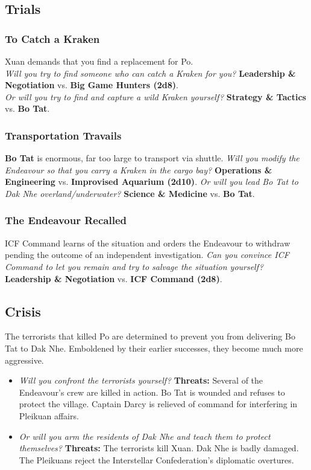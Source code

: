 \documentclass[11pt, a5paper, parskip=half-, DIV=12]{scrartcl}
\begin{document}
\newpage

\subsection*{Trials}
\subsubsection*{To Catch a Kraken}
Xuan demands that you find a replacement for Po. \\
\textit{Will you try to find someone who can catch a Kraken for you?} \textbf{Leadership \& Negotiation} vs. \textbf{Big Game Hunters (2d8)}. \\ \textit{Or will you try to find and capture a wild Kraken yourself?} \textbf{Strategy \& Tactics} vs. \textbf{Bo Tat}.

\subsubsection*{Transportation Travails}
\textbf{Bo Tat} is enormous, far too large to transport via shuttle.
\textit{Will you modify the Endeavour so that you carry a Kraken in the cargo bay?} \textbf{Operations \& Engineering} vs. \textbf{Improvised Aquarium (2d10)}. \textit{Or will you lead Bo Tat to Dak Nhe overland/underwater?} \textbf{Science \& Medicine} vs. \textbf{Bo Tat}.

\subsubsection*{The Endeavour Recalled}
ICF Command learns of the situation and orders the Endeavour to withdraw pending the outcome of an independent investigation. \textit{Can you convince ICF Command to let you remain and try to salvage the situation yourself?} \textbf{Leadership \& Negotiation} vs. \textbf{ICF Command (2d8)}.

\subsection*{Crisis}
The terrorists that killed Po are determined to prevent you from delivering Bo Tat to Dak Nhe. Emboldened by their earlier successes, they become much more aggressive. 
\begin{itemize}
	\item \textit{Will you confront the terrorists yourself?} \textbf{Threats:} Several of the Endeavour's crew are killed in action. Bo Tat is wounded and refuses to protect the village. Captain Darcy is relieved of command for interfering in Pleikuan affairs. 
	\item \textit{Or will you arm the residents of Dak Nhe and teach them to protect themselves?} \textbf{Threats:} The terrorists kill Xuan. Dak Nhe is badly damaged. The Pleikuans reject the Interstellar Confederation's diplomatic overtures. 
\end{itemize}
\end{document}
